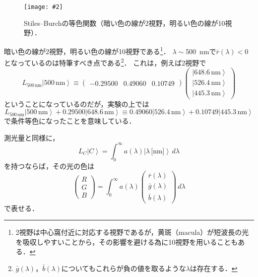 \documentclass[uplatex,paper=a4,fontsize=4.0truemm,jafontsize=4.0truemm,head_space=30.0truemm,foot_space=30.0truemm,baselineskip=8.0truemm,line_length=40zw,gutter=25.0truemm,oneside,openany,fleqn,hanging_panctuation,open_bracket_pos=nibu_tentsuki,dvipdfmx,jis2004,book,titlepage]{jlreq}
\theoremstyle{mystyle}
\newcommand{\captiondot}[1]{\caption{#1．}}
\newcommand{\figureinput}[4]{\begin{figure}[tbp]\centering\texttt{[image: \#2]}\captiondot{#3}\label{fig:#4}\end{figure}}
\newcommand{\mathdisplaystyle}[1]{\(\displaystyle{#1}\)}
\newcommand{\negativevalue}[1]{{-#1}}
\newcommand{\parentheses}[1]{\left(#1\right)}
\newcommand{\Diracket}[1]{\left\lvert#1\right\rangle}
\newcommand{\easymatrix}[1]{\mathord{\begin{pmatrix}#1\end{pmatrix}}}
\begin{document}
			\figureinput{width=\linewidth}{D:/a/figs/RGBcmf.png}{Stiles--Burchの等色関数（暗い色の線が2\textdegree 視野，明るい色の線が10\textdegree 視野）}{matching}
			暗い色の線が2\textdegree 視野，明るい色の線が10\textdegree 視野である\footnote{2\textdegree 視野は中心窩付近に対応する視野であるが，黄斑（macula）が短波長の光を吸収しやすいことから，その影響を避ける為に10\textdegree 視野を用いることもある．}．
			\mathdisplaystyle{\lambda\sim{}}\SI{500}{nm}で\mathdisplaystyle{\bar{r}\parentheses{\lambda}<0}となっているのは特筆すべき点である\footnote{\mathdisplaystyle{\bar{g}\parentheses{\lambda}}，\mathdisplaystyle{\bar{b}\parentheses{\lambda}}についてもこれらが負の値を取るような\mathdisplaystyle{\lambda}は存在する．}．
			これは，例えば2\textdegree 視野で
			\begin{equation*}
				L_{500\,\textrm{nm}}\Diracket{500\,\textrm{nm}}\equiv \easymatrix{\negativevalue{0.29500} & 0.49060 & 0.10749}\easymatrix{\Diracket{648.6\,\textrm{nm}} \\ \Diracket{526.4\,\textrm{nm}} \\ \Diracket{445.3\,\textrm{nm}}}
			\end{equation*}
			ということになっているのだが，実験の上では
			\begin{equation*}
				L_{500\,\textrm{nm}}\Diracket{500\,\textrm{nm}}+0.29500\Diracket{648.6\,\textrm{nm}}\equiv0.49060\Diracket{526.4\,\textrm{nm}}+0.10749\Diracket{445.3\,\textrm{nm}}
			\end{equation*}
			で条件等色になったことを意味している．

			測光量と同様に，
			\begin{equation*}
				L_C\Diracket{C}=\int_0^\infty{a\parentheses{\lambda}\Diracket{\lambda\,\textrm{[nm]}}}\,d\lambda
			\end{equation*}
			を持つならば，その光の色は
			\begin{equation*}
				\easymatrix{R \\ G \\ B}=\int_0^\infty{a\parentheses{\lambda}\easymatrix{\bar{r}\parentheses{\lambda} \\ \bar{g}\parentheses{\lambda} \\ \bar{b}\parentheses{\lambda}}}\,d\lambda
			\end{equation*}
			で表せる．
\end{document}
